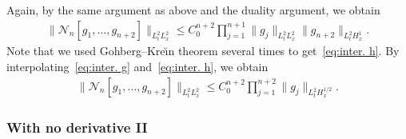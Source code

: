 \documentclass[AHL,Unicode,longabstracts,MathTools,published]{cedram}
\newcommand{\CN}{\mathcal{N}}
\begin{document}
Again, by the same argument as above and the duality argument, we obtain
\begin{align}\label{eq:inter. h}
\|\CN_n[g_1,\dots,g_{n+2}]\|_{L^2_t L^2_x}
\le C_0^{n+2} \prod_{j=1}^{n+1} \|g_j\|_{L^2_t L^2_x} \|g_{n+2}\|_{L^2_t H^1_x}.
\end{align}
Note that we used Gohberg--Kre\u{\i}n theorem several times to get~\eqref{eq:inter. h}. By interpolating~\eqref{eq:inter. g} and~\eqref{eq:inter. h}, we obtain
\begin{align}\label{eq:no deriv}
\|\CN_n[g_1,\dots,g_{n+2}]\|_{L^2_t L^2_x} \le C_0^{n+2} \prod_{j=1}^{n+2} \|g_j\|_{L^2_t H^{1/2}_x}.
\end{align}

\subsubsection{With no derivative II}
\end{document}
